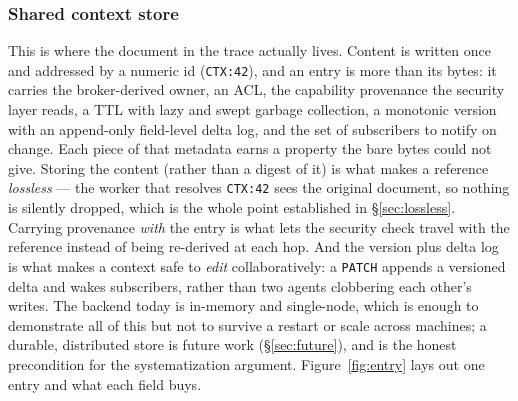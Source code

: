 \documentclass[11pt]{article}
\begin{document}
\subsubsection{Shared context store}\label{sec:arch:store}
This is where the document in the trace actually lives. Content is written once and addressed by a
numeric id (\texttt{CTX:42}), and an entry is more than its bytes: it carries the broker-derived owner,
an ACL, the capability provenance the security layer reads, a TTL with lazy and swept garbage
collection, a monotonic version with an append-only field-level delta log, and the set of subscribers
to notify on change. Each piece of that metadata earns a property the bare bytes could not give. Storing
the content (rather than a digest of it) is what makes a reference \emph{lossless} --- the worker that
resolves \texttt{CTX:42} sees the original document, so nothing is silently dropped, which is the whole
point established in \S\ref{sec:lossless}. Carrying provenance \emph{with} the entry is what lets the
security check travel with the reference instead of being re-derived at each hop. And the version plus
delta log is what makes a context safe to \emph{edit} collaboratively: a \texttt{PATCH} appends a
versioned delta and wakes subscribers, rather than two agents clobbering each other's writes. The
backend today is in-memory and single-node, which is enough to demonstrate all of this but not to
survive a restart or scale across machines; a durable, distributed store is future work
(\S\ref{sec:future}), and is the honest precondition for the systematization argument.
Figure~\ref{fig:entry} lays out one entry and what each field buys.
\end{document}
